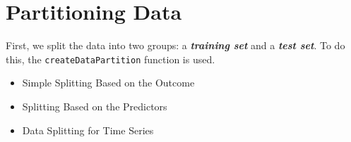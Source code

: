 \documentclass[caret-main.tex]{subfiles}
\begin{document}
\section{Partitioning Data}
First, we split the data into two groups: a \textbf{\textit{training set}} and a \textbf{\textit{test set}}. 
To do this, the \texttt{createDataPartition}
function is used.

\begin{itemize}
\item Simple Splitting Based on the Outcome
\item Splitting Based on the Predictors
\item Data Splitting for Time Series
\end{itemize}
\end{document}
